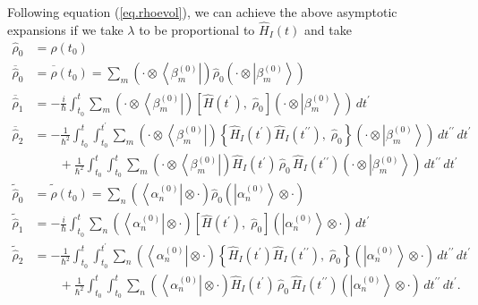 \documentclass[11pt]{article}
\newcommand{\bra}[1]{\left\langle#1\right|}
\newcommand{\ket}[1]{\left|#1\right\rangle}
\newcommand{\op}[1]{\hat{#1}}
\theoremstyle{theorem}
\theoremstyle{remark}
\theoremstyle{step}
\theoremstyle{gap}
\begin{document}
Following equation (\ref{eq.rhoevol}), we can achieve the above asymptotic expansions if we take \(\lambda\) to be proportional to \(\op{H}_I(t)\) and take
\begin{align}
\nonumber\op{\rho}_0 &= \op{\rho}\left(t_0\right) \\
\label{eq.rho0red}\overline{\op{\rho}}_0 &= \overline{\op{\rho}}\left(t_0\right) =  \sum_m \left(\cdot\otimes\bra{\beta_m^{(0)}}\right) \op{\rho}_0 \left(\cdot\otimes\ket{\beta_m^{(0)}}\right) \\
\label{eq.rho1red}\overline{\op{\rho}}_1 &= -\frac{i}{\hbar} \int_{t_0}^t \sum_m \left(\cdot\otimes\bra{\beta_m^{(0)}}\right) \left[\op{H}(t^\prime),\; \op{\rho}_0 \right]\left(\cdot\otimes\ket{\beta_m^{(0)}}\right) \,dt^\prime\\
\label{eq.rho2red}\overline{\op{\rho}}_2 &= - \frac{1}{\hbar^2} \int_{t_0}^t \int_{t_0}^{t^\prime} \sum_m \left(\cdot\otimes\bra{\beta_m^{(0)}}\right) \left\{ \op{H}_I (t^\prime) \op{H}_I(t^{\prime\prime}),\; \op{\rho}_0 \right\}\left(\cdot\otimes\ket{\beta_m^{(0)}}\right)\,dt^{\prime\prime}\,dt^\prime \\
\nonumber&\hspace{2em}+ \frac{1}{\hbar^2} \int_{t_0}^t \int_{t_0}^{t} \sum_m \left(\cdot\otimes\bra{\beta_m^{(0)}}\right) \op{H}_I (t^\prime) \,\op{\rho}_0\, \op{H}_I (t^{\prime\prime})\left(\cdot\otimes\ket{\beta_m^{(0)}}\right)\,dt^{\prime\prime}\,dt^\prime \\
\nonumber\widetilde{\op{\rho}}_0 &= \widetilde{\op{\rho}}\left(t_0\right) =  \sum_n \left(\bra{\alpha_n^{(0)}}\otimes\cdot\right) \op{\rho}_0 \left(\ket{\alpha_n^{(0)}}\otimes\cdot\right) \\
\nonumber\widetilde{\op{\rho}}_1 &= -\frac{i}{\hbar} \int_{t_0}^t \sum_n \left(\bra{\alpha_n^{(0)}}\otimes\cdot\right) \left[\op{H}(t^\prime),\; \op{\rho}_0 \right]\left(\ket{\alpha_n^{(0)}}\otimes\cdot\right) \,dt^\prime\\
\nonumber\widetilde{\op{\rho}}_2 &= - \frac{1}{\hbar^2} \int_{t_0}^t \int_{t_0}^{t^\prime} \sum_n \left(\bra{\alpha_n^{(0)}}\otimes\cdot\right) \left\{ \op{H}_I (t^\prime) \op{H}_I(t^{\prime\prime}),\; \op{\rho}_0 \right\}\left(\ket{\alpha_n^{(0)}}\otimes\cdot\right)\,dt^{\prime\prime}\,dt^\prime \\
\nonumber&\hspace{2em}+ \frac{1}{\hbar^2} \int_{t_0}^t \int_{t_0}^{t} \sum_n \left(\bra{\alpha_n^{(0)}}\otimes\cdot\right) \op{H}_I (t^\prime) \,\op{\rho}_0\, \op{H}_I (t^{\prime\prime})\left(\ket{\alpha_n^{(0)}}\otimes\cdot\right)\,dt^{\prime\prime}\,dt^\prime.
\end{align}
\end{document}
